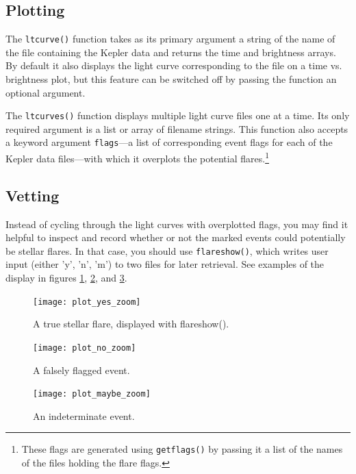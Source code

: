 \documentclass[11pt]{article}
\begin{document}
\subsection{Plotting}
\label{sec:basic}
The \verb|ltcurve()| function takes as its primary argument a string
of the name of the file containing the Kepler data and returns the
time and brightness arrays.  By default it also displays the light
curve corresponding to the file on a time vs. brightness plot, but
this feature can be switched off by passing the function an optional
argument.

The \verb|ltcurves()| function displays multiple light curve files one
at a time.  Its only required argument is a list or array of filename
strings. This function also accepts a keyword argument
\verb|flags|---a list of corresponding event flags for each of the
Kepler data files---with which it overplots the potential
flares.\footnote{These flags are generated using \texttt{getflags()}
  by passing it a list of the names of the files holding the flare
  flags.}

\subsection{Vetting}
\label{sec:vet}

Instead of cycling through the light curves with overplotted flags,
you may find it helpful to inspect and record whether or not the
marked events could potentially be stellar flares.  In that case, you
should use \verb|flareshow()|, which writes user input (either 'y',
'n', 'm') to two files for later retrieval.  See examples of the
display in figures \ref{fig:yes}, \ref{fig:no}, and \ref{fig:maybe}.
\begin{figure}[h!]
  \caption{A true stellar flare, displayed with flareshow().}
  \label{fig:yes}
  \centering
    \texttt{[image: plot\_yes\_zoom]}
\end{figure}

\begin{figure}[h!]
  \caption{A falsely flagged event.}
  \label{fig:no}
  \centering
    \texttt{[image: plot\_no\_zoom]}
\end{figure}

\begin{figure}[h!]
  \caption{An indeterminate event.}
  \label{fig:maybe}
  \centering
    \texttt{[image: plot\_maybe\_zoom]}
\end{figure}
\end{document}

